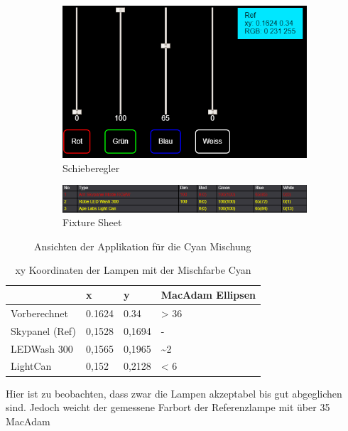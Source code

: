 \documentclass[11pt]{scrartcl}
\begin{document}
\begin{figure}[H]
    \centering
    \begin{subfigure}[b]{.39\textwidth}
        \includegraphics[width=\textwidth]{images/app_mix_cyan_faders.png}
        \caption{Schieberegler}
    \end{subfigure}
    \hfill 
    \begin{subfigure}[b]{.59\textwidth}
        \includegraphics[width=\textwidth]{images/app_mix_cyan_fixtureSheet.png}
        \caption{Fixture Sheet}
    \end{subfigure}
    \caption{Ansichten der Applikation für die Cyan Mischung}
\end{figure}
\noindent
\begin{table}[H]
    \begin{tabularx}{\textwidth}{|X|X|X|X|}
        \hline           & x        & y        & MacAdam Ellipsen\\\hline
        Vorberechnet     & 0.1624   & 0.34     & > 36\\\hline
        Skypanel (Ref)   & 0,1528   & 0,1694   & -\\\hline
        LEDWash 300      & 0,1565   & 0,1965   & \textasciitilde 2\\\hline
        LightCan         & 0,152    & 0,2128   & < 6\\\hline
    \end{tabularx}
    \caption{xy Koordinaten der Lampen mit der Mischfarbe Cyan}
\end{table}
\noindent
Hier ist zu beobachten, dass zwar die Lampen akzeptabel bis gut abgeglichen sind. Jedoch weicht der gemessene Farbort der Referenzlampe mit über 35 MacAdam
\end{document}
